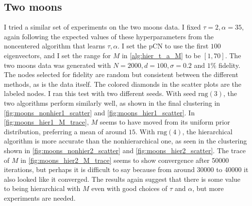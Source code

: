 \documentclass{siamart1116}
\begin{document}
\subsection{Two moons}
I tried a similar set of experiments on the two moons data. I fixed $\tau = 2, \alpha = 35$, again following the expected values of these hyperparameters from the noncentered algorithm that learns $\tau,\alpha$. I set the pCN to use the first $100$ eigenvectors, and I set the range for $M$ in \cref{alg:hier_t_a_M} to be $[1, 70]$. The two moons data was generated with $N=2000, d=100, \sigma = 0.2$ and $1\%$ fidelity. The nodes selected for fidelity are random but consistent between the different methods, as is the data itself. The colored diamonds in the scatter plots are the labeled nodes. I ran this test with two different seeds. With seed $\text{rng}(3)$, the two algorithms perform similarly well, as shown in the final clustering in \cref{fig:moons_nonhier1_scatter} and \cref{fig:moons_hier1_scatter}. In \cref{fig:moons_hier1_M_trace}, $M$ seems to have moved from its uniform prior distribution, preferring a mean of around $15$. With $\text{rng}(4)$, the hierarchical algorithm is more accurate than the nonhierarchical one, as seen in the clustering shown in \cref{fig:moons_nonhier2_scatter} and \cref{fig:moons_hier2_scatter}. The trace of $M$ in \cref{fig:moons_hier2_M_trace} seems to show convergence after 50000 iterations, but perhaps it is difficult to say because from around 30000 to 40000 it also looked like it converged. The results again suggest that there is some value to being hierarchical with $M$ even with good choices of $\tau$ and $\alpha$, but more experiments are needed. 

\end{document}
